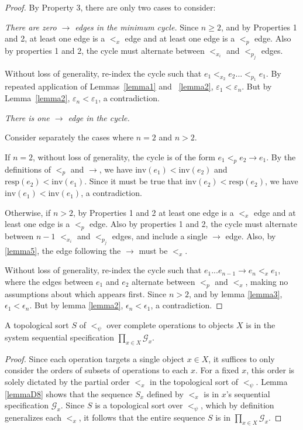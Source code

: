 \begin{proof}
By Property 3, there are only two cases to consider:

 \textit{There are zero $\rightarrow$ edges in the minimum cycle.} Since $n \geq 2$, and by Properties 1 and 2, at least one edge is a $<_x$ edge and at least one edge is a $<_p$ edge. Also by properties 1 and 2, the cycle must alternate between $<_{x_i}$ and $<_{p_j}$ edges. 

Without loss of generality, re-index the cycle such that $e_1 <_{x_2} e_2 ... <_{p_1} e_1$. By repeated application of Lemmas~\ref{lemma1} and ~\ref{lemma2}, $\varepsilon_1 < \varepsilon_n$. But by Lemma~\ref{lemma2}, $\varepsilon_n < \varepsilon_1$, a contradiction.

 \textit{There is one $\rightarrow$ edge in the cycle.}

Consider separately the cases where $n = 2$ and $n > 2$.

If $n = 2$, without loss of generality, the cycle is of the form $e_1 <_p e_2 \rightarrow e_1$. By the definitions of $<_p$ and $\rightarrow$, we have $\text{inv}(e_1) < \text{inv}(e_2)$ and $\text{resp}(e_2) < \text{inv}(e_1)$. Since it must be true that $\text{inv}(e_2) < \text{resp}(e_2)$, we have $\text{inv}(e_1) < \text{inv}(e_1)$, a contradiction.

Otherwise, if $n > 2$, by Properties 1 and 2 at least one edge is a $<_x$ edge and at least one edge is a $<_p$ edge. Also by properties 1 and 2, the cycle must alternate between $n-1$ $<_{x_i}$ and $<_{p_j}$ edges, and include a single $\rightarrow$ edge. Also, by \ref{lemma5}, the edge following the $\rightarrow$ must be $<_x$. 

Without loss of generality, re-index the cycle such that $e_1 ... e_{n-1} \rightarrow e_n <_x e_1$, where the edges between $e_1$ and $e_2$ alternate between $<_p$ and $<_x$, making no assumptions about which appears first. Since $n > 2$, and by lemma \ref{lemma3}, $\epsilon_1 < \epsilon_n$. But by lemma \ref{lemma2}, $\epsilon_n < \epsilon_1$, a contradiction.
\end{proof}


\begin{lem}
    \label{lemmaD14}
    A topological sort $S$ of $<_\psi$ over complete operations to objects $X$ is in the system sequential specification $\prod_{x \in X}\mathcal{G}_x$.
\end{lem}
\begin{proof}
    Since each operation targets a single object $x \in X$, it suffices to only consider the orders of subsets of operations to each $x$. For a fixed $x$, this order is solely dictated by the partial order $<_x$ in the topological sort of $<_\psi$. Lemma \ref{lemmaD8} shows that the sequence $S_x$ defined by $<_x$ is in $x$'s sequential specification $\mathcal{G}_x$. Since $S$ is a topological sort over $<_\psi$, which by definition generalizes each $<_x$, it follows that the entire sequence $S$ is in $\prod_{x \in X}\mathcal{G}_x$.
\end{proof}

